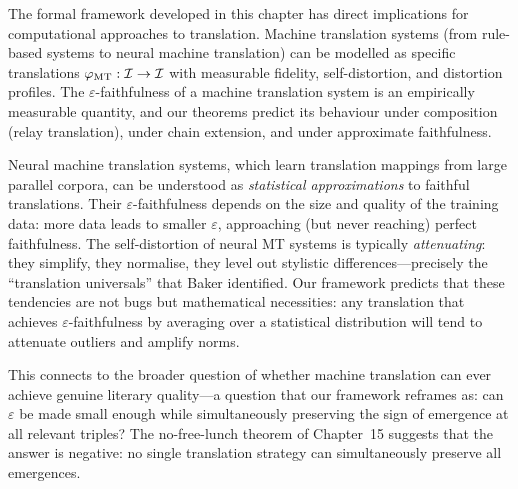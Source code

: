 \begin{remark}
The formal framework developed in this chapter has direct implications for computational approaches to translation.  Machine translation systems (from rule-based systems to neural machine translation) can be modelled as specific translations $\varphi_{\mathrm{MT}} : \mathcal{I} \to \mathcal{I}$ with measurable fidelity, self-distortion, and distortion profiles.  The $\varepsilon$-faithfulness of a machine translation system is an empirically measurable quantity, and our theorems predict its behaviour under composition (relay translation), under chain extension, and under approximate faithfulness.

Neural machine translation systems, which learn translation mappings from large parallel corpora, can be understood as \emph{statistical approximations} to faithful translations.  Their $\varepsilon$-faithfulness depends on the size and quality of the training data: more data leads to smaller $\varepsilon$, approaching (but never reaching) perfect faithfulness.  The self-distortion of neural MT systems is typically \emph{attenuating}: they simplify, they normalise, they level out stylistic differences---precisely the ``translation universals'' that Baker identified.  Our framework predicts that these tendencies are not bugs but mathematical necessities: any translation that achieves $\varepsilon$-faithfulness by averaging over a statistical distribution will tend to attenuate outliers and amplify norms.

This connects to the broader question of whether machine translation can ever achieve genuine literary quality---a question that our framework reframes as: can $\varepsilon$ be made small enough while simultaneously preserving the sign of emergence at all relevant triples?  The no-free-lunch theorem of Chapter~15 suggests that the answer is negative: no single translation strategy can simultaneously preserve all emergences.
\end{remark}

